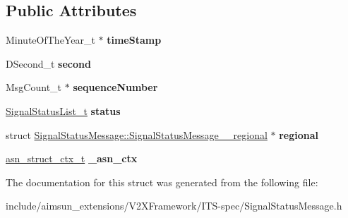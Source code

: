 \subsection*{Public Attributes}
\begin{DoxyCompactItemize}
\item 
Minute\+Of\+The\+Year\+\_\+t $\ast$ {\bfseries time\+Stamp}\hypertarget{structSignalStatusMessage_a87c03ecfab7c17b9e65bf4c2523872fe}{}\label{structSignalStatusMessage_a87c03ecfab7c17b9e65bf4c2523872fe}

\item 
D\+Second\+\_\+t {\bfseries second}\hypertarget{structSignalStatusMessage_adcf50957fe5f1bd6909ca4b2729fd8b3}{}\label{structSignalStatusMessage_adcf50957fe5f1bd6909ca4b2729fd8b3}

\item 
Msg\+Count\+\_\+t $\ast$ {\bfseries sequence\+Number}\hypertarget{structSignalStatusMessage_ab4d7baf0bcde5cba37a7b651d823f47c}{}\label{structSignalStatusMessage_ab4d7baf0bcde5cba37a7b651d823f47c}

\item 
\hyperlink{structSignalStatusList}{Signal\+Status\+List\+\_\+t} {\bfseries status}\hypertarget{structSignalStatusMessage_ac4d23ee4f98b309585c025ca8b31a1d7}{}\label{structSignalStatusMessage_ac4d23ee4f98b309585c025ca8b31a1d7}

\item 
struct \hyperlink{structSignalStatusMessage_1_1SignalStatusMessage____regional}{Signal\+Status\+Message\+::\+Signal\+Status\+Message\+\_\+\+\_\+regional} $\ast$ {\bfseries regional}\hypertarget{structSignalStatusMessage_a03bb55df22fa9e00cb3aecd063b25a37}{}\label{structSignalStatusMessage_a03bb55df22fa9e00cb3aecd063b25a37}

\item 
\hyperlink{structasn__struct__ctx__s}{asn\+\_\+struct\+\_\+ctx\+\_\+t} {\bfseries \+\_\+asn\+\_\+ctx}\hypertarget{structSignalStatusMessage_aed1da7679c44e6964f7d182e2572ef1c}{}\label{structSignalStatusMessage_aed1da7679c44e6964f7d182e2572ef1c}

\end{DoxyCompactItemize}


The documentation for this struct was generated from the following file\+:\begin{DoxyCompactItemize}
\item 
include/aimsun\+\_\+extensions/\+V2\+X\+Framework/\+I\+T\+S-\/spec/Signal\+Status\+Message.\+h\end{DoxyCompactItemize}
